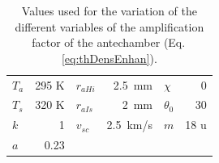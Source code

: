 	\begin{table}[h]
		\begin{center}
			\begin{tabular}{|l r |l r |l r|}
				\hline
				$T_a$ 	& 295 K	& $r_{aHi}$	& 2.5\, mm	& $\chi$	& 0\degree \\
				$T_s$ 	& 320 K & $r_{aIs}$ & 2\, mm	& $\theta_0$& 30\degree\\	
				$k$		&	1	& $v_{sc}$	& 2.5\, km/s& $m$		& 18 u\\
				$a$		& 0.23	&			&			&			&	\\
				\hline
			\end{tabular}
		\end{center}
		\caption{Values used for the variation of the different variables of the amplification factor of the antechamber (Eq.\,\eqref{eq:thDensEnhan}).}
		\label{tab:thDensEnhan}
	\end{table}

